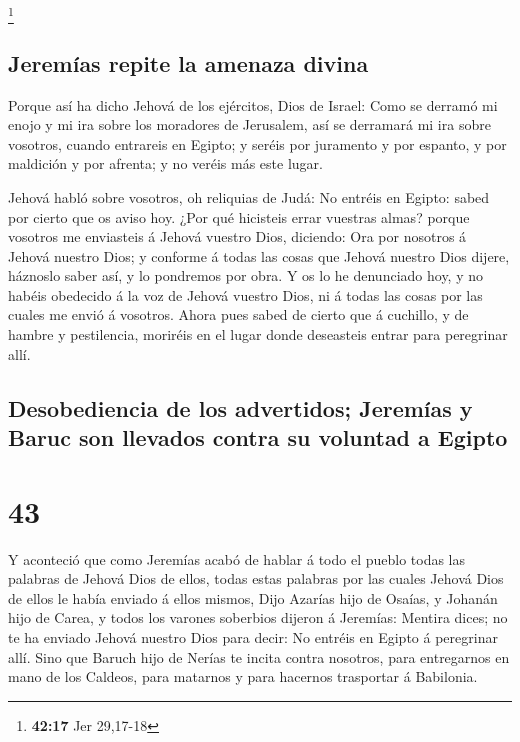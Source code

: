 \footnote{\textbf{42:17} Jer 29,17-18}

\hypertarget{jeremuxedas-repite-la-amenaza-divina}{%
\subsection{Jeremías repite la amenaza
divina}\label{jeremuxedas-repite-la-amenaza-divina}}

 Porque así ha dicho Jehová de los ejércitos, Dios de
Israel: Como se derramó mi enojo y mi ira sobre los moradores de
Jerusalem, así se derramará mi ira sobre vosotros, cuando entrareis en
Egipto; y seréis por juramento y por espanto, y por maldición y por
afrenta; y no veréis más este lugar.

 Jehová habló sobre vosotros, oh reliquias de Judá: No
entréis en Egipto: sabed por cierto que os aviso hoy.  ¿Por
qué hicisteis errar vuestras almas? porque vosotros me enviasteis á
Jehová vuestro Dios, diciendo: Ora por nosotros á Jehová nuestro Dios; y
conforme á todas las cosas que Jehová nuestro Dios dijere, háznoslo
saber así, y lo pondremos por obra.  Y os lo he denunciado
hoy, y no habéis obedecido á la voz de Jehová vuestro Dios, ni á todas
las cosas por las cuales me envió á vosotros.  Ahora pues
sabed de cierto que á cuchillo, y de hambre y pestilencia, moriréis en
el lugar donde deseasteis entrar para peregrinar allí.

\hypertarget{desobediencia-de-los-advertidos-jeremuxedas-y-baruc-son-llevados-contra-su-voluntad-a-egipto}{%
\subsection{Desobediencia de los advertidos; Jeremías y Baruc son
llevados contra su voluntad a
Egipto}\label{desobediencia-de-los-advertidos-jeremuxedas-y-baruc-son-llevados-contra-su-voluntad-a-egipto}}

\hypertarget{section-42}{%
\section{43}\label{section-42}}

 Y aconteció que como Jeremías acabó de hablar á todo el
pueblo todas las palabras de Jehová Dios de ellos, todas estas palabras
por las cuales Jehová Dios de ellos le había enviado á ellos mismos,
 Dijo Azarías hijo de Osaías, y Johanán hijo de Carea, y
todos los varones soberbios dijeron á Jeremías: Mentira dices; no te ha
enviado Jehová nuestro Dios para decir: No entréis en Egipto á
peregrinar allí.  Sino que Baruch hijo de Nerías te incita
contra nosotros, para entregarnos en mano de los Caldeos, para matarnos
y para hacernos trasportar á Babilonia.

